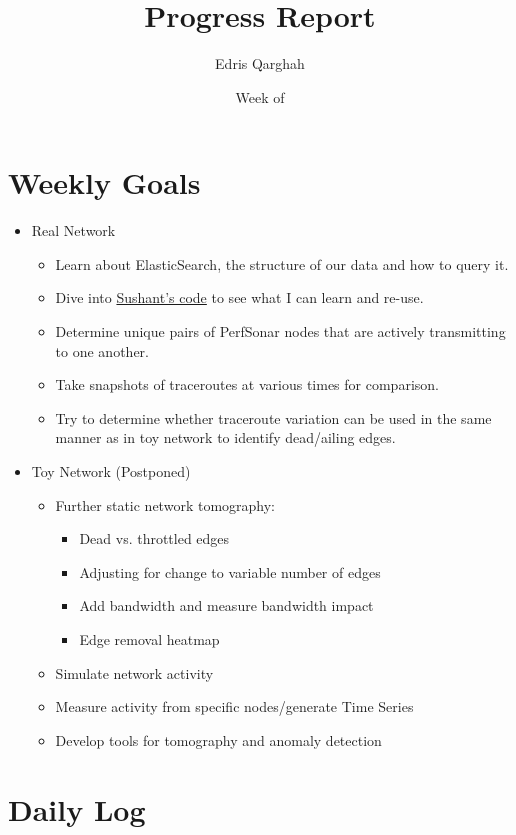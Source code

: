 \documentclass{weeklyreport}
\title{Progress Report}
\author{Edris Qarghah}
\date{Week of \DTMusedate{reportdate}}
\begin{document}
\maketitle

\newpage

\section*{Weekly Goals}


\begin{itemize}
	\item Real Network
	\begin{itemize}
		\item Learn about ElasticSearch, the structure of our data and how to query it.
		\item Dive into \href{https://github.com/sand-ci/Analytics}{Sushant’s code} to see what I can learn and re-use.
		\item Determine unique pairs of PerfSonar nodes that are actively transmitting to one another.
		\item Take snapshots of traceroutes at various times for comparison.
		\item Try to determine whether traceroute variation can be used in the same manner as in toy network to identify dead/ailing edges.
	\end{itemize}
	\item Toy Network (Postponed)
	\begin{itemize}
		\item Further static network tomography:
		\begin{itemize}
			\item Dead vs. throttled edges
			\item Adjusting for change to variable number of edges
			\item Add bandwidth and measure bandwidth impact
			\item Edge removal heatmap
		\end{itemize}
		\item Simulate network activity
		\item Measure activity from specific nodes/generate Time Series
		\item Develop tools for tomography and anomaly detection
	\end{itemize}
\end{itemize}

\section*{Daily Log}
\end{document}

